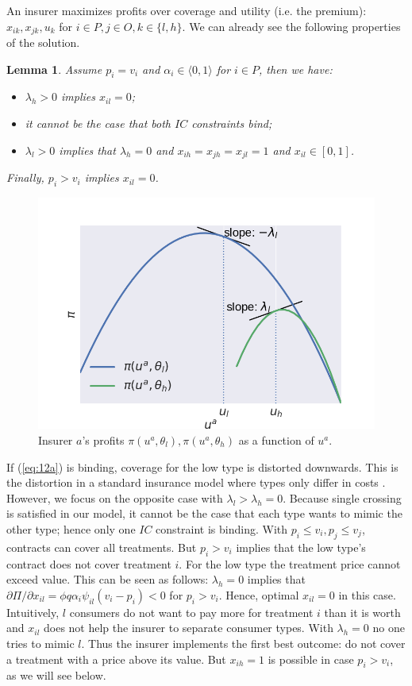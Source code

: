 \documentclass[12pt,english,a4paper]{article}
\newtheorem{lemma}{Lemma}
\begin{document}
An insurer maximizes profits over coverage and utility (i.e. the premium): \(x_{ik},x_{jk},u_k\) for \(i \in P, j \in O, k \in \{l,h\}\). We can already see the following properties of the solution.
\begin{lemma}\label{lem:properties}
Assume $p_i = v_i$ and $\alpha_i \in \langle 0,1 \rangle$ for $i \in P$, then we have:
\begin{itemize}
\item $\lambda_h>0$ implies $x_{il}=0$;
\item it cannot be the case that both $IC$ constraints bind;
\item $\lambda_{l}>0$ implies that $\lambda_h=0$ and $x_{ih}=x_{jh}=x_{jl}=1$ and $x_{il} \in [0,1]$.
\end{itemize}
Finally, $p_i >v_i$ implies $x_{il} =0$.
\end{lemma}

\begin{figure}[htbp]
\centering
\includegraphics[width=.9\linewidth]{profitfunctions.png}
\caption{\label{fig:profitfunctions} Insurer \(a\)'s profits \(\pi(u^a,\theta_l),\pi(u^a,\theta_h)\) as a function of \(u^a\).}
\end{figure}

If (\ref{eq:12a}) is binding, coverage for the low type is distorted downwards. This is the distortion in a standard insurance model where types only differ in costs \citep{rot76}. However, we focus on the opposite case with \(\lambda_l > \lambda_h = 0\). Because single crossing is satisfied in our model, it cannot be the case that each type wants to mimic the other type; hence only one \(IC\) constraint is binding. With \(p_i \leq v_i, p_j \leq v_j\), contracts can cover all treatments. But \(p_i > v_i\) implies that the low type's contract does not cover treatment \(i\). For the low type the treatment price cannot exceed value. This can be seen as follows: \(\lambda_h =0\) implies that \(\partial \Pi/\partial x_{il}=\phi q \alpha_i \psi_{il} (v_i-p_i) < 0\) for \(p_i > v_i\). Hence, optimal \(x_{il}=0\) in this case. Intuitively, \(l\) consumers do not want to pay more for treatment \(i\) than it is worth and \(x_{il}\) does not help the insurer to separate consumer types. With \(\lambda_h = 0\) no one tries to mimic \(l\). Thus the insurer implements the first best outcome: do not cover a treatment with a price above its value. But \(x_{ih}=1\) is possible in case \(p_i > v_i\), as we will see below.
\end{document}
